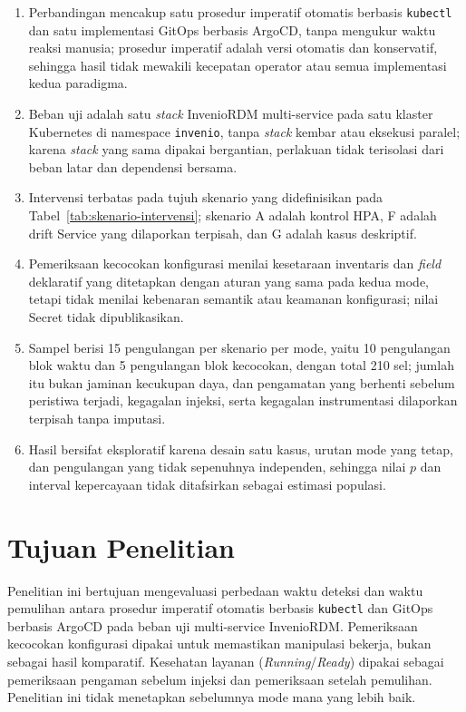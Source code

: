 \begin{enumerate}
  \item Perbandingan mencakup satu prosedur imperatif otomatis berbasis \texttt{kubectl} dan satu implementasi GitOps berbasis ArgoCD, tanpa mengukur waktu reaksi manusia; prosedur imperatif adalah versi otomatis dan konservatif, sehingga hasil tidak mewakili kecepatan operator atau semua implementasi kedua paradigma.
  \item Beban uji adalah satu \textit{stack} InvenioRDM multi-service pada satu klaster Kubernetes di namespace \texttt{invenio}, tanpa \textit{stack} kembar atau eksekusi paralel; karena \textit{stack} yang sama dipakai bergantian, perlakuan tidak terisolasi dari beban latar dan dependensi bersama.
  \item Intervensi terbatas pada tujuh skenario yang didefinisikan pada Tabel~\ref{tab:skenario-intervensi}; skenario A adalah kontrol HPA, F adalah drift Service yang dilaporkan terpisah, dan G adalah kasus deskriptif.
  \item Pemeriksaan kecocokan konfigurasi menilai kesetaraan inventaris dan \textit{field} deklaratif yang ditetapkan dengan aturan yang sama pada kedua mode, tetapi tidak menilai kebenaran semantik atau keamanan konfigurasi; nilai Secret tidak dipublikasikan.
  \item Sampel berisi 15 pengulangan per skenario per mode, yaitu 10 pengulangan blok waktu dan 5 pengulangan blok kecocokan, dengan total 210 sel; jumlah itu bukan jaminan kecukupan daya, dan pengamatan yang berhenti sebelum peristiwa terjadi, kegagalan injeksi, serta kegagalan instrumentasi dilaporkan terpisah tanpa imputasi.
  \item Hasil bersifat eksploratif karena desain satu kasus, urutan mode yang tetap, dan pengulangan yang tidak sepenuhnya independen, sehingga nilai $p$ dan interval kepercayaan tidak ditafsirkan sebagai estimasi populasi.
\end{enumerate}

\section{Tujuan Penelitian}

Penelitian ini bertujuan mengevaluasi perbedaan waktu deteksi dan waktu pemulihan antara prosedur imperatif otomatis berbasis \texttt{kubectl} dan GitOps berbasis ArgoCD pada beban uji multi-service InvenioRDM. Pemeriksaan kecocokan konfigurasi dipakai untuk memastikan manipulasi bekerja, bukan sebagai hasil komparatif. Kesehatan layanan (\textit{Running}/\textit{Ready}) dipakai sebagai pemeriksaan pengaman sebelum injeksi dan pemeriksaan setelah pemulihan. Penelitian ini tidak menetapkan sebelumnya mode mana yang lebih baik.

